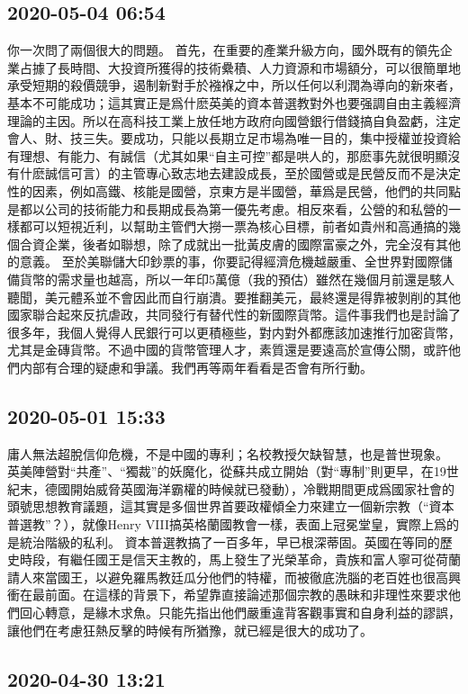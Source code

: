 \documentclass[twocolumn]{ctexart}
\begin{document}
\subsection*{2020-05-04 06:54}

你一次問了兩個很大的問題。
首先，在重要的產業升級方向，國外既有的領先企業占據了長時間、大投資所獲得的技術纍積、人力資源和市場額分，可以很簡單地承受短期的殺價競爭，遏制新對手於襁褓之中，所以任何以利潤為導向的新來者，基本不可能成功；這其實正是爲什麽英美的資本普選教對外也要强調自由主義經濟理論的主因。所以在高科技工業上放任地方政府向國營銀行借錢搞自負盈虧，注定會人、財、技三失。要成功，只能以長期立足市場為唯一目的，集中授權並投資給有理想、有能力、有誠信（尤其如果“自主可控”都是哄人的，那麽事先就很明顯沒有什麽誠信可言）的主管專心致志地去建設成長，至於國營或是民營反而不是決定性的因素，例如高鐵、核能是國營，京東方是半國營，華爲是民營，他們的共同點是都以公司的技術能力和長期成長為第一優先考慮。相反來看，公營的和私營的一樣都可以短視近利，以幫助主管們大撈一票為核心目標，前者如貴州和高通搞的幾個合資企業，後者如聯想，除了成就出一批黃皮膚的國際富豪之外，完全沒有其他的意義。
至於美聯儲大印鈔票的事，你要記得經濟危機越嚴重、全世界對國際儲備貨幣的需求量也越高，所以一年印5萬億（我的預估）雖然在幾個月前還是駭人聽聞，美元體系並不會因此而自行崩潰。要推翻美元，最終還是得靠被剝削的其他國家聯合起來反抗虐政，共同發行有替代性的新國際貨幣。這件事我們也是討論了很多年，我個人覺得人民銀行可以更積極些，對内對外都應該加速推行加密貨幣，尤其是金磚貨幣。不過中國的貨幣管理人才，素質還是要遠高於宣傳公關，或許他們内部有合理的疑慮和爭議。我們再等兩年看看是否會有所行動。
\subsection*{2020-05-01 15:33}

庸人無法超脫信仰危機，不是中國的專利；名校教授欠缺智慧，也是普世現象。
英美陣營對“共產”、“獨裁”的妖魔化，從蘇共成立開始（對“專制”則更早，在19世紀末，德國開始威脅英國海洋霸權的時候就已發動），冷戰期間更成爲國家社會的頭號思想教育議題，這其實是多個世界首要政權傾全力來建立一個新宗教（“資本普選教”？），就像Henry VIII搞英格蘭國教會一樣，表面上冠冕堂皇，實際上爲的是統治階級的私利。
資本普選教搞了一百多年，早已根深蒂固。英國在等同的歷史時段，有繼任國王是信天主教的，馬上發生了光榮革命，貴族和富人寧可從荷蘭請人來當國王，以避免羅馬教廷瓜分他們的特權，而被徹底洗腦的老百姓也很高興衝在最前面。在這樣的背景下，希望靠直接論述那個宗教的愚昧和非理性來要求他們回心轉意，是緣木求魚。只能先指出他們嚴重違背客觀事實和自身利益的謬誤，讓他們在考慮狂熱反擊的時候有所猶豫，就已經是很大的成功了。
\subsection*{2020-04-30 13:21}
\end{document}
